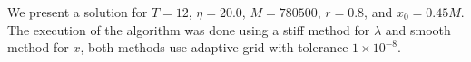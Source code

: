 %
%
%
%
%

%
%
%
%
%
We present a solution for $T=12$, $\eta=20.0$, $M=780500$, $r=0.8$, and $x_0=0.45M$. The execution of the algorithm was done using a stiff method for $\lambda$ and smooth method for $x$, both methods use adaptive grid with tolerance $1\times 10^{-8}$. 

